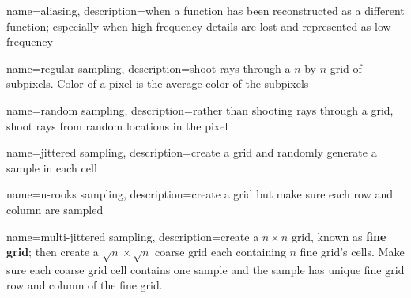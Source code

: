 {
  name=aliasing,
  description={when a function has been reconstructed as a
  different function; especially when high frequency details are lost and
  represented as low frequency}
}

{
  name=regular sampling,
  description={shoot rays through a $ n $ by $ n $ grid of subpixels.
  Color of a pixel is the average color of the subpixels}
}

{
  name=random sampling,
  description={rather than shooting rays through a grid, shoot rays from
  random locations in the pixel}
}

{
  name=jittered sampling,
  description={create a grid and randomly generate a sample in each cell}
}

{
  name=n-rooks sampling,
  description={create a grid but make sure each row and column are sampled}
}

{
  name=multi-jittered sampling,
  description={create a $ n \times n $ grid, known as \textbf{fine grid};
  then create a $ \sqrt{n} \times \sqrt{n} $ coarse grid each
  containing $ n $ fine grid's cells.
  Make sure each coarse grid cell contains one sample
  and the sample has unique fine grid row and column of the fine grid.}
}

